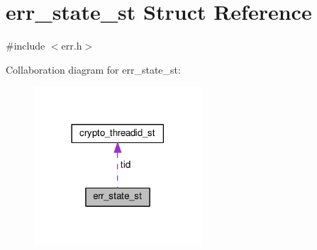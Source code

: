 \hypertarget{structerr__state__st}{}\section{err\+\_\+state\+\_\+st Struct Reference}
\label{structerr__state__st}


{\ttfamily \#include $<$err.\+h$>$}



Collaboration diagram for err\+\_\+state\+\_\+st\+:
\nopagebreak
\begin{figure}[H]
\begin{center}
\leavevmode
\includegraphics[width=177pt]{structerr__state__st__coll__graph}
\end{center}
\end{figure}
